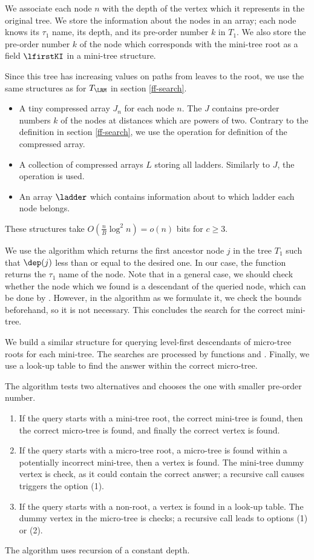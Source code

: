 We associate each node $n$ with the depth of the vertex which it represents in the original tree.
We store the information about the nodes in an array; each node knows its $\tau_1$ name, its depth, and its pre-order number $k$ in $T_1$.
We also store the pre-order number $k$ of the node which corresponds with the mini-tree root as a field $\lfirstKI$ in a mini-tree structure.

Since this tree has increasing values on paths from leaves to the root, we use the same structures as for $T_{\LRM}$ in section \ref{ff-search}.
\begin{itemize}
	\item A tiny compressed array $J_n$ for each node $n$.
	The $J$ contains pre-order numbers $k$ of the nodes at distances which are powers of two.
	Contrary to the definition in section \ref{ff-search}, we use the operation \pred{} for definition of the compressed array.
	\item A collection of compressed arrays $L$ storing all ladders.
	Similarly to $J$, the operation \pred{} is used.
	\item An array $\ladder$ which contains information about to which ladder each node belongs.
\end{itemize}
These structures take $O(\frac{n}{B} \log^2 n) = o(n)$ bits for $c \ge 3$.

We use the algorithm \LRMSearch{} which returns the first ancestor node $j$ in the tree $T_1$ such that $\dep(j)$ less than or equal to the desired one.
In our case, the function returns the $\tau_1$ name of the node.
Note that in a general case, we should check whether the node which we found is a descendant of the queried node, which can be done by \isAncestor{}.
However, in the algorithm as we formulate it, we check the bounds beforehand, so it is not necessary.
This concludes the search for the correct mini-tree.

We build a similar structure for querying level-first descendants of micro-tree roots for each mini-tree.
The searches are processed by functions \ldSearchI{} and \ldSearchII{}.
Finally, we use a look-up table to find the answer within the correct micro-tree.

The algorithm tests two alternatives and chooses the one with smaller pre-order number.
\begin{enumerate}
	\item If the query starts with a mini-tree root, the correct mini-tree is found, then the correct micro-tree is found, and finally the correct vertex is found.
	\item If the query starts with a micro-tree root, a micro-tree is found within a potentially incorrect mini-tree, then a vertex is found.
	The mini-tree dummy vertex is check, as it could contain the correct answer; a recursive call causes triggers the option (1).
	\item If the query starts with a non-root, a vertex is found in a look-up table.
	The dummy vertex in the micro-tree is checks; a recursive call leads to options (1) or (2).
\end{enumerate}
The algorithm uses recursion of a constant depth.


